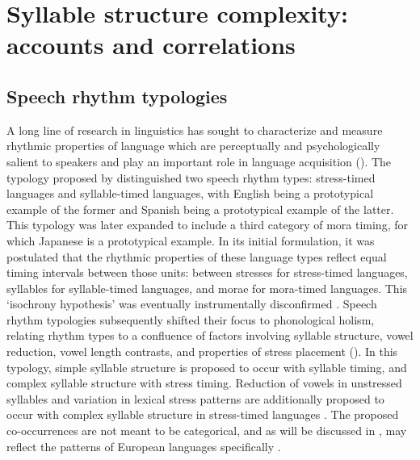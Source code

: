 \section{Syllable structure complexity: accounts and correlations}\label{sec:1.3}
\subsection{Speech rhythm typologies}\label{sec:1.3.1}

  A long line of research in linguistics has sought to characterize and measure rhythmic properties of language which are perceptually and psychologically salient to speakers and play an important role in language acquisition (\citealt{CutlerMehler1993}). The typology proposed by \citet{Pike1945} distinguished two speech rhythm types: stress-timed languages and syllable-timed languages, with English being a prototypical example of the former and Spanish being a prototypical example of the latter. This typology was later expanded to include a third category of mora timing, for which Japanese is a prototypical example. In its initial formulation, it was postulated that the rhythmic properties of these language types reflect equal timing intervals between those units: between stresses for stress-timed languages, syllables for syllable-timed languages, and morae for mora-timed languages. This ‘isochrony hypothesis’ was eventually instrumentally disconfirmed \citep{Roach1982}. Speech rhythm typologies subsequently shifted their  focus to phonological holism, relating rhythm types to a confluence of factors involving syllable structure, vowel reduction, vowel length contrasts, and properties of stress placement (\citealt{Roach1982,Dauer1983}). In this typology, simple syllable structure is proposed to occur with syllable timing, and complex syllable structure with stress timing. Reduction of vowels in unstressed syllables and variation in lexical stress patterns are additionally proposed to occur with complex syllable structure in stress-timed languages \citep{Auer1993}. The proposed co-occurrences are not meant to be categorical, and as will be discussed in , may reflect the patterns of European languages specifically \citep{Schiering2007}.

